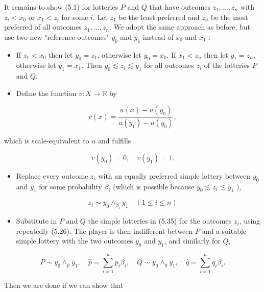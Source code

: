 \documentclass[12pt]{article}
\begin{document}
It remains to show (5.1) for lotteries $P$ and $Q$ that have outcomes $z_{1}, \ldots, z_{n}$ with $z_{i}<x_{0}$ or $x_{1}<z_{i}$ for some $i$. Let $z_{1}$ be the least preferred and $z_{n}$ be the most preferred of all outcomes $z_{1}, \ldots, z_{n}$. We adopt the same approach as before, but use two new "reference outcomes" $y_{0}$ and $y_{1}$ instead of $x_{0}$ and $x_{1}$ :

\begin{itemize}
  \item If $z_{1}<x_{0}$ then let $y_{0}=z_{1}$, otherwise let $y_{0}=x_{0}$. If $x_{1}<z_{n}$ then let $y_{1}=z_{n}$, otherwise let $y_{1}=x_{1}$. Then $y_{0} \lesssim z_{i} \lesssim y_{1}$ for all outcomes $z_{i}$ of the lotteries $P$ and $Q$.
  \item Define the function $v: X \rightarrow \mathbb{R}$ by
\end{itemize}

$$
v(x)=\frac{u(x)-u\left(y_{0}\right)}{u\left(y_{1}\right)-u\left(y_{0}\right)},
$$

which is scale-equivalent to $u$ and fulfills

$$
v\left(y_{0}\right)=0, \quad v\left(y_{1}\right)=1 .
$$

\begin{itemize}
  \item Replace every outcome $z_{i}$ with an equally preferred simple lottery between $y_{0}$ and $y_{1}$ for some probability $\beta_{i}$ (which is possible because $y_{0} \lesssim z_{i} \lesssim y_{1}$ ),
\end{itemize}


\begin{equation*}
z_{i} \sim y_{0} \wedge_{\beta_{i}} y_{1} \quad(1 \leq i \leq n) \tag{5.35}
\end{equation*}


\begin{itemize}
  \item Substitute in $P$ and $Q$ the simple lotteries in (5.35) for the outcomes $z_{i}$, using repeatedly (5.26). The player is then indifferent between $P$ and a suitable simple lottery with the two outcomes $y_{0}$ and $y_{1}$, and similarly for $Q$,
\end{itemize}

$$
P \sim y_{0} \wedge_{\hat{p}} y_{1}, \quad \hat{p}=\sum_{i=1}^{n} p_{i} \beta_{i}, \quad Q \sim y_{0} \wedge_{\hat{q}} y_{1}, \quad \hat{q}=\sum_{i=1}^{n} q_{i} \beta_{i} .
$$

Then we are done if we can show that
\end{document}
